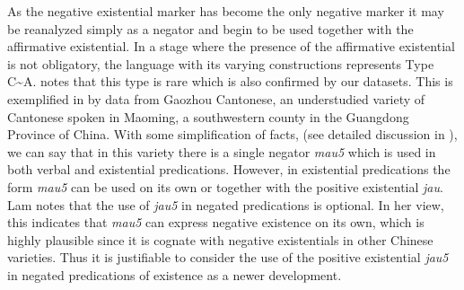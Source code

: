 \documentclass[output=paper,chinesefont,colorlinks,citecolor=brown]{langscibook}
\begin{document}
As the negative existential marker has become the only negative marker it may be reanalyzed simply as a negator and begin to be used together with the affirmative existential. In a stage where the presence of the affirmative existential is not obligatory, the language with its varying constructions represents Type C{\textasciitilde}A. \citep{Croft1991} notes that this type is rare which is also confirmed by our datasets. This is exemplified in  by data from Gaozhou Cantonese, an understudied variety of Cantonese spoken in Maoming, a southwestern county in the Guangdong Province of China. With some simplification of facts, (see detailed discussion in ), we can say that in this variety there is a single negator \textit{mau5} which is used in both verbal and existential predications. However, in existential predications the form \textit{mau5} can be used on its own or together with the positive existential \textit{jau}. Lam notes that the use of \textit{jau5} in negated predications is optional. In her view, this indicates that \textit{mau5} can express negative existence on its own, which is highly plausible since it is cognate with negative existentials in other Chinese varieties. Thus it is justifiable to consider the use of the positive existential \textit{jau5} in negated predications of existence  as a newer development.
\end{document}
